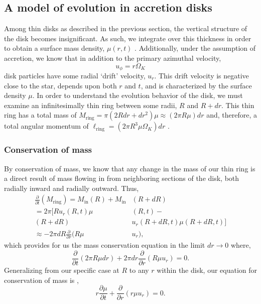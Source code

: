 \documentclass[aps,pra,twocolumn]{revtex4-1}
\begin{document}
\subsection{\label{section2.1} A model of evolution in accretion disks }
Among thin disks as described in the previous section, the vertical structure of the disk becomes insignificant.  As such, we integrate over this thickness in order to obtain a surface mass density, $\mu(r, t)$  \cite{armitage2011}.  Additionally, under the assumption of accretion, we know that in addition to the primary azimuthal velocity,
\begin{equation}
u_\phi = r\Omega_K
\end{equation}
disk particles have some radial `drift' velocity, $u_r$.  This drift velocity is negative close to the star, depends upon both $r$ and $t$, and is characterized by the surface density $\mu$.  In order to understand the evolution behavior of the disk, we must examine an infinitesimally thin ring between some radii, $R$ and $R + dr$.  This thin ring has a total mass of $M_\text{ring} = \pi \left(2 R dr + dr^2 \right)\mu \approx (2 \pi R \mu) dr$ and, therefore, a total angular momentum of $\ell_\text{ring} = (2\pi R^3 \mu \Omega_K)dr$ \cite{king2002}.

\subsubsection{\label{section 2.1.1} Conservation of mass}
By conservation of mass, we know that any change in the mass of our thin ring is a direct result of mass flowing in from neighboring sections of the disk, both radially inward and radially outward.  Thus,
\begin{equation}
\begin{split}
\frac{\partial}{\partial t}\left(  M_\text{ring}\right)= M_{\text{in}}(R) + M_{\text{in}}&(R + dR)  \\
= 2\pi [ R u_r(R, t) \mu&(R, t) -   \\
(R + dR)& u_r(R+dR, t) \mu(R+dR, t)] \\
 \approx -2\pi dR \frac{\partial}{\partial r}(R\mu& u_r),
\nonumber
\end{split}
\end{equation}
which provides for us the mass conservation equation in the limit $dr \rightarrow 0$ where,
\begin{equation}
\frac{\partial}{\partial t}\left(  2\pi R  \mu dr \right) + 2\pi dr \frac{\partial}{\partial r}(R \mu u_r) = 0. \nonumber
\end{equation}
Generalizing from our specific case at $R$ to any $r$ within the disk, our equation for conservation of mass is \cite{king2002},
\begin{equation}
r \frac{\partial \mu}{\partial t} + \frac{\partial}{\partial r}(r \mu u_r) = 0. \label{consMass}
\end{equation}
\end{document}
